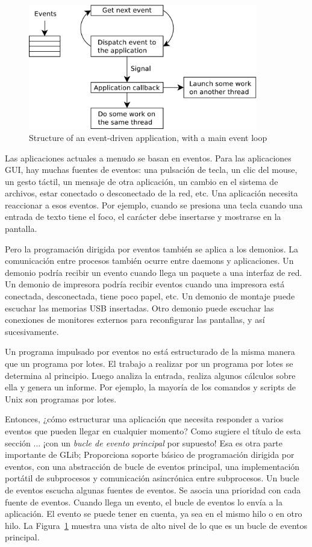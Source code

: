 \begin{figure}
  \begin{center}
    \includegraphics[width=10cm]{imagenes/event-loop.pdf}
    \caption{Structure of an event-driven application, with a main event loop}
    \label{glib-event-loop}
  \end{center}
\end{figure}

Las aplicaciones actuales a menudo se basan en eventos. Para las aplicaciones GUI, hay muchas fuentes de eventos: una pulsación de tecla, un clic del mouse, un gesto táctil, un mensaje de otra aplicación, un cambio en el sistema de archivos, estar conectado o desconectado de la red, etc. Una aplicación necesita reaccionar a esos eventos. Por ejemplo, cuando se presiona una tecla cuando una entrada de texto tiene el foco, el carácter debe insertarse y mostrarse en la pantalla.

Pero la programación dirigida por eventos también se aplica a los demonios. La comunicación entre procesos también ocurre entre daemons y aplicaciones. Un demonio podría recibir un evento cuando llega un paquete a una interfaz de red. Un demonio de impresora podría recibir eventos cuando una impresora está conectada, desconectada, tiene poco papel, etc. Un demonio de montaje puede escuchar las memorias USB insertadas. Otro demonio puede escuchar las conexiones de monitores externos para reconfigurar las pantallas, y así sucesivamente.

Un programa impulsado por eventos no está estructurado de la misma manera que un programa por lotes. El trabajo a realizar por un programa por lotes se determina al principio. Luego analiza la entrada, realiza algunos cálculos sobre ella y genera un informe. Por ejemplo, la mayoría de los comandos y scripts de Unix son programas por lotes.

Entonces, ¿cómo estructurar una aplicación que necesita responder a varios eventos que pueden llegar en cualquier momento? Como sugiere el título de esta sección ... ¡con un \emph{bucle de evento principal} por supuesto! Esa es otra parte importante de GLib; Proporciona soporte básico de programación dirigida por eventos, con una abstracción de bucle de eventos principal, una implementación portátil de subprocesos y comunicación asincrónica entre subprocesos. Un bucle de eventos escucha algunas fuentes de eventos. Se asocia una prioridad con cada fuente de eventos. Cuando llega un evento, el bucle de eventos lo envía a la aplicación. El evento se puede tener en cuenta, ya sea en el mismo hilo o en otro hilo. La Figura~\ref{glib-event-loop} muestra una vista de alto nivel de lo que es un bucle de eventos principal.

